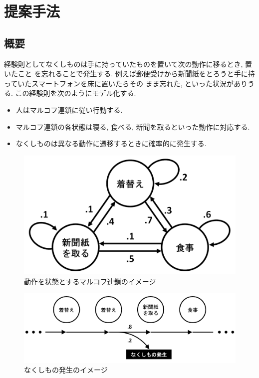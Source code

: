 \chapter{提案手法}\label{chap:method}

\section{概要}
経験則としてなくしものは手に持っていたものを置いて次の動作に移るとき, 置いたこと
を忘れることで発生する.
例えば郵便受けから新聞紙をとろうと手に持っていたスマートフォンを床に置いたらその
まま忘れた, といった状況がありうる.
この経験則を次のようにモデル化する.
\begin{itemize}
    \item
    人はマルコフ連鎖に従い行動する.
    \item
    マルコフ連鎖の各状態は寝る, 食べる, 新聞を取るといった動作に対応する.
    \item
    なくしものは異なる動作に遷移するときに確率的に発生する.
\end{itemize}

\begin{figure}[H]
    \begin{center}
    \includegraphics[width=0.6\linewidth]{figs/model_1.png}
    \caption{動作を状態とするマルコフ連鎖のイメージ}
    \label{fig:model1}
    \end{center}
\end{figure}

\begin{figure}[H]
    \begin{center}
    \includegraphics[width=0.8\linewidth]{figs/model_2.png}
    \caption{なくしもの発生のイメージ}
    \label{fig:model2}
    \end{center}
\end{figure}

